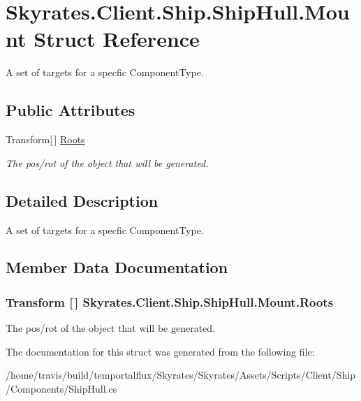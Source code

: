 \hypertarget{struct_skyrates_1_1_client_1_1_ship_1_1_ship_hull_1_1_mount}{\section{Skyrates.\-Client.\-Ship.\-Ship\-Hull.\-Mount Struct Reference}
\label{struct_skyrates_1_1_client_1_1_ship_1_1_ship_hull_1_1_mount}
}


A set of targets for a specfic Component\-Type.  


\subsection*{Public Attributes}
\begin{DoxyCompactItemize}
\item 
Transform\mbox{[}$\,$\mbox{]} \hyperlink{struct_skyrates_1_1_client_1_1_ship_1_1_ship_hull_1_1_mount_a0821e6acb28576b18538cca2f78034d7}{Roots}
\begin{DoxyCompactList}\small\item\em The pos/rot of the object that will be generated. \end{DoxyCompactList}\end{DoxyCompactItemize}


\subsection{Detailed Description}
A set of targets for a specfic Component\-Type. 



\subsection{Member Data Documentation}
\hypertarget{struct_skyrates_1_1_client_1_1_ship_1_1_ship_hull_1_1_mount_a0821e6acb28576b18538cca2f78034d7}{
\subsubsection[{Roots}]{\setlength{\rightskip}{0pt plus 5cm}Transform \mbox{[}$\,$\mbox{]} Skyrates.\-Client.\-Ship.\-Ship\-Hull.\-Mount.\-Roots}}\label{struct_skyrates_1_1_client_1_1_ship_1_1_ship_hull_1_1_mount_a0821e6acb28576b18538cca2f78034d7}


The pos/rot of the object that will be generated. 



The documentation for this struct was generated from the following file\-:\begin{DoxyCompactItemize}
\item 
/home/travis/build/temportalflux/\-Skyrates/\-Skyrates/\-Assets/\-Scripts/\-Client/\-Ship/\-Components/Ship\-Hull.\-cs\end{DoxyCompactItemize}
